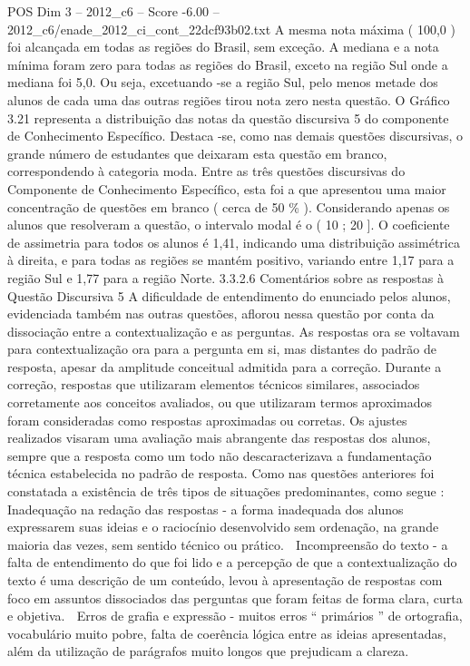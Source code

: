 \begin{textsample}{POS Dim 3 – 2012\_c6 – Score -6.00 – 2012\_c6/enade\_2012\_ci\_cont\_22dcf93b02.txt}
A mesma nota máxima ( 100,0 ) foi alcançada em todas as regiões do Brasil, sem exceção.
A mediana e a nota mínima foram zero para todas as regiões do Brasil, exceto na região Sul onde a mediana foi 5,0.
Ou seja, excetuando -se a região Sul, pelo menos metade dos alunos de cada uma das outras regiões tirou nota zero nesta questão.
O Gráfico 3.21 representa a distribuição das notas da questão discursiva 5 do componente de Conhecimento Específico.
Destaca -se, como nas demais questões discursivas, o grande número de estudantes que deixaram esta questão em branco, correspondendo à categoria moda.
Entre as três questões discursivas do Componente de Conhecimento Específico, esta foi a que apresentou uma maior concentração de questões em branco ( cerca de 50 \% ).
Considerando apenas os alunos que resolveram a questão, o intervalo modal é o ( 10 ; 20 ].
O coeficiente de assimetria para todos os alunos é 1,41, indicando uma distribuição assimétrica à direita, e para todas as regiões se mantém positivo, variando entre 1,17 para a região Sul e 1,77 para a região Norte. 3.3.2.6 Comentários sobre as respostas à Questão Discursiva 5 A dificuldade de entendimento do enunciado pelos alunos, evidenciada também nas outras questões, aflorou nessa questão por conta da dissociação entre a contextualização e as perguntas.
As respostas ora se voltavam para contextualização ora para a pergunta em si, mas distantes do padrão de resposta, apesar da amplitude conceitual admitida para a correção.
Durante a correção, respostas que utilizaram elementos técnicos similares, associados corretamente aos conceitos avaliados, ou que utilizaram termos aproximados foram consideradas como respostas aproximadas ou corretas.
Os ajustes realizados visaram uma avaliação mais abrangente das respostas dos alunos, sempre que a resposta como um todo não descaracterizava a fundamentação técnica estabelecida no padrão de resposta.
Como nas questões anteriores foi constatada a existência de três tipos de situações predominantes, como segue :  Inadequação na redação das respostas - a forma inadequada dos alunos expressarem suas ideias e o raciocínio desenvolvido sem ordenação, na grande maioria das vezes, sem sentido técnico ou prático.  Incompreensão do texto - a falta de entendimento do que foi lido e a percepção de que a contextualização do texto é uma descrição de um conteúdo, levou à apresentação de respostas com foco em assuntos dissociados das perguntas que foram feitas de forma clara, curta e objetiva.  Erros de grafia e expressão - muitos erros “ primários ” de ortografia, vocabulário muito pobre, falta de coerência lógica entre as ideias apresentadas, além da utilização de parágrafos muito longos que prejudicam a clareza.

\end{textsample}
